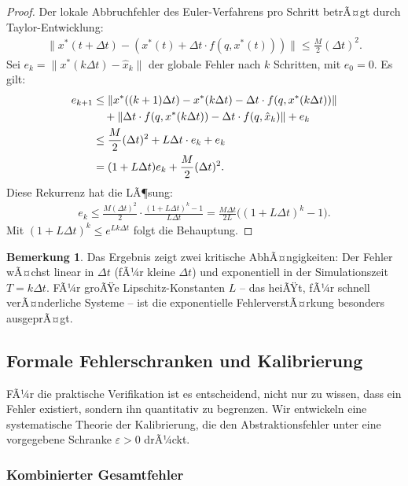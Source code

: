 ﻿\documentclass[a4paper,12pt]{article}
\theoremstyle{definition}
\newtheorem{remark}{Bemerkung}[section]
\begin{document}
\begin{proof}
Der lokale Abbruchfehler des Euler-Verfahrens pro Schritt betrÃ¤gt durch Taylor-Entwicklung:
\begin{align}
  \|x^*(t + \Delta t) - (x^*(t) + \Delta t \cdot f(q, x^*(t)))\| \leq \frac{M}{2} (\Delta t)^2.
\end{align}
Sei $e_k = \|x^*(k\Delta t) - \hat{x}_k\|$ der globale Fehler nach $k$ Schritten, mit $e_0 = 0$. Es gilt:
\begin{align}
  e_{k+1} &\leq \|x^*(( k+1)\Delta t) - x^*(k\Delta t) - \Delta t \cdot f(q, x^*(k\Delta t))\| \\
           &\quad + \|\Delta t \cdot f(q, x^*(k\Delta t)) - \Delta t \cdot f(q, \hat{x}_k)\| + e_k \notag \\
           &\leq \frac{M}{2}(\Delta t)^2 + L \Delta t \cdot e_k + e_k \notag \\
           &= (1 + L\Delta t) e_k + \frac{M}{2}(\Delta t)^2. \notag
\end{align}
Diese Rekurrenz hat die LÃ¶sung:
\begin{align}
  e_k \leq \frac{M(\Delta t)^2}{2} \cdot \frac{(1+L\Delta t)^k - 1}{L\Delta t} = \frac{M\Delta t}{2L}\bigl((1+L\Delta t)^k - 1\bigr).
\end{align}
Mit $(1 + L\Delta t)^k \leq e^{Lk\Delta t}$ folgt die Behauptung.
\end{proof}

\begin{remark}
Das Ergebnis zeigt zwei kritische AbhÃ¤ngigkeiten: Der Fehler wÃ¤chst linear in $\Delta t$ (fÃ¼r kleine $\Delta t$) und exponentiell in der Simulationszeit $T = k\Delta t$. FÃ¼r groÃŸe Lipschitz-Konstanten $L$ -- das heiÃŸt, fÃ¼r schnell verÃ¤nderliche Systeme -- ist die exponentielle FehlerverstÃ¤rkung besonders ausgeprÃ¤gt.
\end{remark}

\subsection{Formale Fehlerschranken und Kalibrierung}

FÃ¼r die praktische Verifikation ist es entscheidend, nicht nur zu wissen, dass ein Fehler existiert, sondern ihn quantitativ zu begrenzen. Wir entwickeln eine systematische Theorie der Kalibrierung, die den Abstraktionsfehler unter eine vorgegebene Schranke $\varepsilon > 0$ drÃ¼ckt.

\subsubsection{Kombinierter Gesamtfehler}
\end{document}
